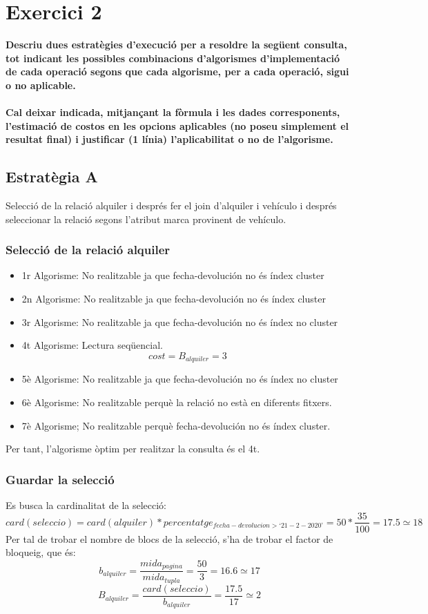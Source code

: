 \documentclass[12pt]{article}
\begin{document}
\section{Exercici 2}
\textbf{Descriu dues estratègies d’execució per a resoldre la següent consulta, tot indicant les possibles combinacions d’algorismes d’implementació de cada operació segons que cada algorisme, per a cada operació, sigui o no aplicable. 
\\\\
Cal deixar indicada, mitjançant la fòrmula i les dades corresponents, l’estimació de costos en les opcions aplicables (no poseu simplement el resultat final) i justificar (1 línia) l’aplicabilitat o no de l’algorisme. }\\
\subsection{Estratègia A}
Selecció de la relació alquiler i després fer el join d’alquiler i vehículo i després seleccionar la relació segons l’atribut marca provinent de vehículo.
\subsubsection{Selecció de la relació alquiler}
\begin{itemize}
\item 1r Algorisme: No realitzable ja que fecha-devolución no és índex cluster
\item 2n Algorisme: No realitzable ja que fecha-devolución no és índex cluster
\item 3r Algorisme: No realitzable ja que fecha-devolución no és índex no cluster
\item 4t Algorisme: Lectura seqüencial.
\[cost = B_{alquiler}=3\]
\item 5è Algorisme: No realitzable ja que fecha-devolución no és índex no cluster
\item 6è Algorisme: No realitzable perquè la relació no està en diferents fitxers.
\item 7è Algorisme; No realitzable perquè fecha-devolución no és índex cluster.
\end{itemize}

Per tant, l’algorisme òptim per realitzar la consulta és el 4t.
\subsubsection{Guardar la selecció}
Es busca la cardinalitat de la selecció:
\[card(seleccio) = card(alquiler) * percentatge_{fecha-devolucion > ‘21-2-2020’}=50*\frac{35}{100}=17.5 \simeq 18
\]
Per tal de trobar el nombre de blocs de la selecció, s’ha de trobar el factor de bloqueig, que és:
\[b_{alquiler}= \frac{mida_{pagina}}{mida_{tupla}}= \frac{50}{3}=16.6 \simeq 17\]
\[B_{alquiler}= \frac{card(seleccio)}{b_{alquiler}}= \frac{17.5}{17} \simeq 2\]
\end{document}
